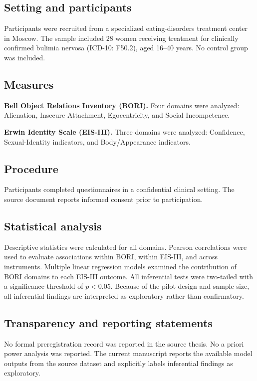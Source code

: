 \documentclass[12pt]{article}
\begin{document}
\subsection{Setting and participants}
Participants were recruited from a specialized eating-disorders treatment center in Moscow. The sample included 28 women receiving treatment for clinically confirmed bulimia nervosa (ICD-10: F50.2), aged 16--40 years. No control group was included.

\subsection{Measures}
\textbf{Bell Object Relations Inventory (BORI).} Four domains were analyzed: Alienation, Insecure Attachment, Egocentricity, and Social Incompetence.

\textbf{Erwin Identity Scale (EIS-III).} Three domains were analyzed: Confidence, Sexual-Identity indicators, and Body/Appearance indicators.

\subsection{Procedure}
Participants completed questionnaires in a confidential clinical setting. The source document reports informed consent prior to participation.

\subsection{Statistical analysis}
Descriptive statistics were calculated for all domains. Pearson correlations were used to evaluate associations within BORI, within EIS-III, and across instruments. Multiple linear regression models examined the contribution of BORI domains to each EIS-III outcome. All inferential tests were two-tailed with a significance threshold of $p<0.05$. Because of the pilot design and sample size, all inferential findings are interpreted as exploratory rather than confirmatory.

\subsection{Transparency and reporting statements}
No formal preregistration record was reported in the source thesis. No a priori power analysis was reported. The current manuscript reports the available model outputs from the source dataset and explicitly labels inferential findings as exploratory.
\end{document}
